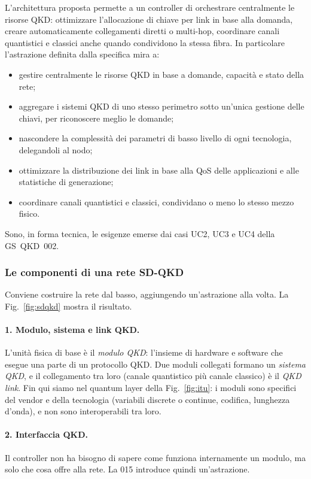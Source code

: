 L'architettura proposta permette a un controller di orchestrare
centralmente le risorse QKD: ottimizzare l'allocazione di chiave per link
in base alla domanda, creare automaticamente collegamenti diretti o
multi-hop, coordinare canali quantistici e classici anche quando
condividono la stessa fibra. In particolare l'astrazione definita dalla
specifica mira a:
\begin{itemize}
  \item gestire centralmente le risorse QKD in base a domande, capacità e
        stato della rete;
  \item aggregare i sistemi QKD di uno stesso perimetro sotto un'unica
        gestione delle chiavi, per riconoscere meglio le domande;
  \item nascondere la complessità dei parametri di basso livello di ogni
        tecnologia, delegandoli al nodo;
  \item ottimizzare la distribuzione dei link in base alla QoS delle
        applicazioni e alle statistiche di generazione;
  \item coordinare canali quantistici e classici, condividano o meno lo
        stesso mezzo fisico.
\end{itemize}
Sono, in forma tecnica, le esigenze emerse dai casi UC2, UC3 e UC4 della
GS~QKD~002.

\subsubsection{Le componenti di una rete SD-QKD}

Conviene costruire la rete dal basso, aggiungendo un'astrazione alla volta.
La Fig.~\ref{fig:sdqkd} mostra il risultato.

\paragraph{1. Modulo, sistema e link QKD.}
L'unità fisica di base è il \emph{modulo QKD}: l'insieme di hardware e
software che esegue una parte di un protocollo QKD. Due moduli collegati
formano un \emph{sistema QKD}, e il collegamento tra loro (canale
quantistico più canale classico) è il \emph{QKD link}. Fin qui siamo nel
quantum layer della Fig.~\ref{fig:itu}: i moduli sono specifici del vendor
e della tecnologia (variabili discrete o continue, codifica, lunghezza
d'onda), e non sono interoperabili tra loro.

\paragraph{2. Interfaccia QKD.}
Il controller non ha bisogno di sapere come funziona internamente un
modulo, ma solo che cosa offre alla rete. La 015 introduce quindi
un'astrazione.

